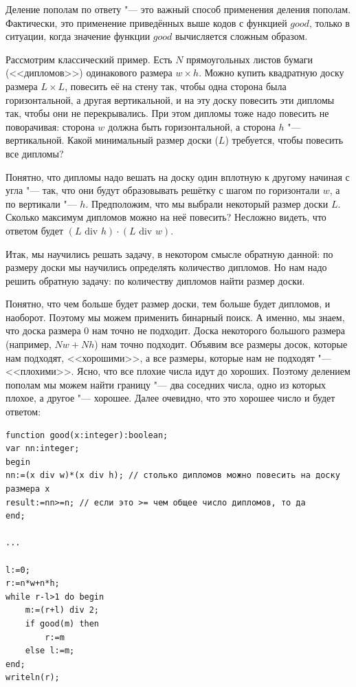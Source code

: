 \documentclass[a4paper,10pt]{problems}
\begin{document}
Деление пополам по ответу "--- это важный способ применения деления пополам.
Фактически, это применение приведённых выше кодов с функцией $good$, только 
в ситуации, когда значение функции $good$ вычисляется сложным образом.

Рассмотрим классический пример. 
Есть $N$ прямоугольных листов бумаги (<<дипломов>>) одинакового размера 
$w\times h$. Можно купить квадратную доску размера $L\times L$, 
повесить её на стену так, чтобы одна сторона была горизонтальной,
а другая вертикальной, и на эту доску повесить эти дипломы так,
чтобы они не перекрывались. 
При этом дипломы тоже надо повесить не поворачивая: сторона $w$ должна быть
горизонтальной, а сторона $h$ "--- вертикальной.
Какой минимальный размер доски ($L$) требуется, чтобы повесить все дипломы?

Понятно, что дипломы надо вешать на доску один вплотную к другому 
начиная с угла "--- так, что они будут образовывать решётку с шагом
по горизонтали $w$, а по вертикали "--- $h$.
Предположим, что мы выбрали некоторый размер доски $L$.
Сколько максимум дипломов можно на неё повесить?
Несложно видеть, что ответом будет $(L\mbox{ div }h)\cdot(L\mbox{ div }w)$.

Итак, мы научились решать задачу, в некотором смысле обратную данной:
по размеру доски мы научились определять количество дипломов.
Но нам надо решить обратную задачу: по количеству дипломов найти размер доски.

Понятно, что чем больше будет размер доски, тем больше будет
дипломов, и наоборот. 
Поэтому мы можем применить бинарный поиск. 
А именно, мы знаем, что доска размера 0 нам точно не подходит.
Доска некоторого большого размера (например, $Nw+Nh$) нам точно подходит.
Объявим все размеры досок, которые нам подходят, <<хорошими>>,
а все размеры, которые нам не подходят "--- <<плохими>>.
Ясно, что все плохие числа идут до хороших.
Поэтому делением пополам мы можем найти границу "--- два соседних числа,
одно из которых плохое, а другое "--- хорошее.
Далее очевидно, что это хорошее число и будет ответом:
\begin{codesampleo}\begin{verbatim}
function good(x:integer):boolean;
var nn:integer;
begin
nn:=(x div w)*(x div h); // столько дипломов можно повесить на доску размера x
result:=nn>=n; // если это >= чем общее число дипломов, то да
end;

...

l:=0;
r:=n*w+n*h;  
while r-l>1 do begin    
    m:=(r+l) div 2;
    if good(m) then
        r:=m
    else l:=m;
end;
writeln(r);
\end{verbatim}
\end{codesampleo}
\end{document}
